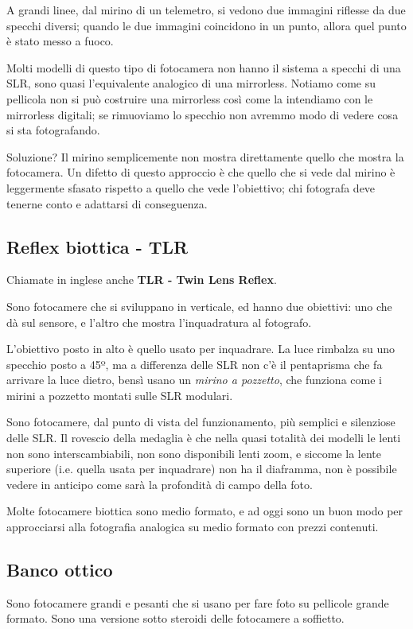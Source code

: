 A grandi linee, dal mirino di un telemetro, si vedono due immagini riflesse da due specchi diversi; quando le due immagini coincidono in un punto, allora quel punto è stato messo a fuoco.

Molti modelli di questo tipo di fotocamera non hanno il sistema a specchi di una SLR, sono quasi l'equivalente analogico di una mirrorless.
Notiamo come su pellicola non si può costruire una mirrorless così come la intendiamo con le mirrorless digitali; se rimuoviamo lo specchio non avremmo modo di vedere cosa si sta fotografando.

Soluzione? Il mirino semplicemente non mostra direttamente quello che mostra la fotocamera. Un difetto di questo approccio è che quello che si vede dal mirino è leggermente sfasato rispetto a quello che vede l'obiettivo; chi fotografa deve tenerne conto e adattarsi di conseguenza.


\subsection{Reflex biottica - TLR} \label{subsec:tlr}
Chiamate in inglese anche \textbf{TLR - Twin Lens Reflex}.

Sono fotocamere che si sviluppano in verticale, ed hanno due obiettivi: uno che dà sul sensore, e l'altro che mostra l'inquadratura al fotografo.

L'obiettivo posto in alto è quello usato per inquadrare. La luce rimbalza su uno specchio posto a 45º, ma a differenza delle SLR non c'è il pentaprisma che fa arrivare la luce dietro, bensì usano un \textit{mirino a pozzetto}, che funziona come i mirini a pozzetto montati sulle SLR modulari.

Sono fotocamere, dal punto di vista del funzionamento, più semplici e silenziose delle SLR. Il rovescio della medaglia è che nella quasi totalità dei modelli le lenti non sono interscambiabili, non sono disponibili lenti zoom, e siccome la lente superiore (i.e. quella usata per inquadrare) non ha il diaframma, non è possibile vedere in anticipo come sarà la profondità di campo della foto.

Molte fotocamere biottica sono medio formato, e ad oggi sono un buon modo per approcciarsi alla fotografia analogica su medio formato con prezzi contenuti.


\subsection{Banco ottico} \label{subsec:bancoottico}
Sono fotocamere grandi e pesanti che si usano per fare foto su pellicole grande formato. Sono una versione sotto steroidi delle fotocamere a soffietto.

